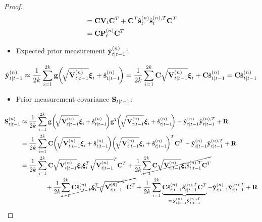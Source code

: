 \begin{proof}
\begin{align*}
					&= \boldsymbol{\mathrm{C}} \boldsymbol{\mathrm{V}}_t \boldsymbol{\mathrm{C}}^T + \boldsymbol{\mathrm{C}}^T \hat{\boldsymbol{\mathrm{s}}}_t^{(n)} \hat{\boldsymbol{\mathrm{s}}}_t^{(n), T} \boldsymbol{\mathrm{C}}^T \\
					&= \boldsymbol{\mathrm{C}} \boldsymbol{\mathrm{P}}_t^{(n)} \boldsymbol{\mathrm{C}}^T
			\end{align*}
			\begin{itemize}
				\item Expected prior measurement \( \hat{\boldsymbol{\mathrm{y}}}_{t \vert t - 1}^{(n)} \):
			\end{itemize}
			\begin{align*}
				\hat{\boldsymbol{\mathrm{y}}}_{t \vert t - 1}^{(n)}
					\approx \frac{1}{2k} \sum_{i = 1}^{2k} \boldsymbol{\mathrm{g}}\bigg(\! \sqrt{\boldsymbol{\mathrm{V}}_{t \vert t - 1}^{(n)}} \boldsymbol{\mathrm{\xi}}_i + \hat{\boldsymbol{\mathrm{s}}}_{t \vert t - 1}^{(n)} \!\bigg)
					= \frac{1}{2k} \sum_{i = 1}^{2k} \boldsymbol{\mathrm{C}} \sqrt{\boldsymbol{\mathrm{V}}_{t \vert t - 1}^{(n)}} \boldsymbol{\mathrm{\xi}}_i + \boldsymbol{\mathrm{C}} \hat{\boldsymbol{\mathrm{s}}}_{t \vert t - 1}^{(n)}
					= \boldsymbol{\mathrm{C}} \hat{\boldsymbol{\mathrm{s}}}_{t \vert t - 1}^{(n)}
			\end{align*}
			\begin{itemize}
				\item Prior measurement covariance \( \boldsymbol{\mathrm{S}}_{t \vert t - 1} \):
			\end{itemize}
			\begin{align*}
				\mat{S}_{t \subgiven t - 1}^{(n)}
					&\approx \frac{1}{2k} \sum_{i = 1}^{2k} \vec{g}\bigg(\!\sqrt{\mat{V}_{t \subgiven t - 1}^{(n)}} \vec{\xi}_i + \hat{\vec{s}}_{t \subgiven t - 1}^{(n)}\!\bigg) \vec{g}^T\!\bigg(\!\sqrt{\mat{V}_{t \subgiven t - 1}^{(n)}} \vec{\xi}_i + \hat{\vec{s}}_{t \subgiven t - 1}^{(n)}\!\bigg) - \hat{\vec{y}}_{t \subgiven t - 1}^{(n)}  \hat{\vec{y}}_{t \subgiven t - 1}^{(n), T} + \mat{R} \\
					&= \frac{1}{2k} \sum_{i = 1}^{2k} \mat{C} \bigg(\!\sqrt{\mat{V}_{t \subgiven t - 1}^{(n)}} \vec{\xi}_i + \hat{\vec{s}}_{t \subgiven t - 1}^{(n)}\!\bigg) \bigg(\!\sqrt{\mat{V}_{t \subgiven t - 1}^{(n)}} \vec{\xi}_i + \hat{\vec{s}}_{t \subgiven t - 1}^{(n)}\!\bigg)^T \mat{C}^T - \hat{\vec{y}}_{t \subgiven t - 1}^{(n)} \hat{\vec{y}}_{t \subgiven t - 1}^{(n), T} + \mat{R} \\
					&= \frac{1}{2k} \sum_{i = 1}^{2k} \mat{C} \sqrt{\mat{V}_{t \subgiven t - 1}^{(n)}} \vec{\xi}_i \vec{\xi}_i^T \sqrt{\mat{V}_{t \subgiven t - 1}^{(n)}}^T \mat{C}^T + \frac{1}{2k} \cancel{\sum_{i = 1}^{2k} \mat{C} \sqrt{\mat{V}_{t \subgiven t - 1}^{(n)}} \vec{\xi}_i \hat{\vec{s}}_{t \subgiven t - 1}^{(n), T} \mat{C}^T} \\
						&\qquad\qquad + \frac{1}{2k} \cancel{\sum_{i = 1}^{2k} \mat{C} \hat{\vec{s}}_{t \subgiven t - 1}^{(n)} \vec{\xi}_i^T \sqrt{\mat{V}_{t \subgiven t - 1}^{(n)}}^T \mat{C}^T} + \frac{1}{2k} \sum_{i = 1}^{2k} \underbrace{\mat{C} \hat{\vec{s}}_{t \subgiven t - 1}^{(n)} \hat{\vec{s}}_{t \subgiven t - 1}^{(n), T} \mat{C}^T}_{=\, \hat{\vec{y}}_{t \subgiven t - 1}^{(n)} \hat{\vec{y}}_{t \subgiven t - 1}^{(n), T}} - \hat{\vec{y}}_{t \subgiven t - 1}^{(n)} \hat{\vec{y}}_{t \subgiven t - 1}^{(n), T} + \mat{R} \\

\end{align*}
\end{proof}

